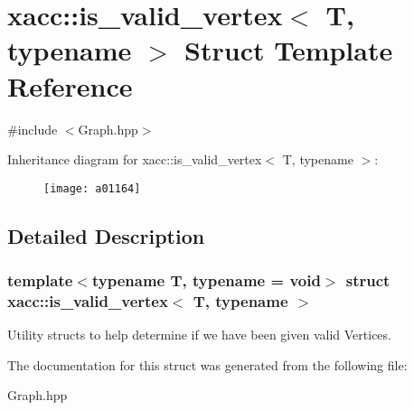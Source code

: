 \hypertarget{a01164}{}\section{xacc\+:\+:is\+\_\+valid\+\_\+vertex$<$ T, typename $>$ Struct Template Reference}
\label{a01164}


{\ttfamily \#include $<$Graph.\+hpp$>$}

Inheritance diagram for xacc\+:\+:is\+\_\+valid\+\_\+vertex$<$ T, typename $>$\+:\begin{figure}[H]
\begin{center}
\leavevmode
\texttt{[image: a01164]}
\end{center}
\end{figure}


\subsection{Detailed Description}
\subsubsection*{template$<$typename T, typename = void$>$\newline
struct xacc\+::is\+\_\+valid\+\_\+vertex$<$ T, typename $>$}

Utility structs to help determine if we have been given valid Vertices. 

The documentation for this struct was generated from the following file\+:\begin{DoxyCompactItemize}
\item 
Graph.\+hpp\end{DoxyCompactItemize}
